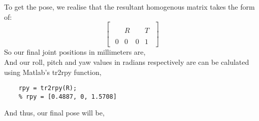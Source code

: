 \documentclass[12pt]{article}
\begin{document}
To get the pose, we realise that the resultant homogenous matrix takes the form of:
\begin{equation*}
    \begin{bmatrix}
        {\begin{array}{ccc|c}&&&\\&R&&T\\&&&\\\hline 0&0&0&1\end{array}}
    \end{bmatrix}
\end{equation*}
So our final joint positions in millimeters are,
\begin{equation*}
    [421.3330, -133.3000, -298.6978]
\end{equation*}
And our roll, pitch and yaw values in radians respectively are can be calulated using Matlab's tr2rpy function,
\begin{center}
    \begin{lstlisting}
    rpy = tr2rpy(R);
    % rpy = [0.4887, 0, 1.5708]
    \end{lstlisting}
\end{center}
And thus, our final pose will be,
\begin{equation*}
    [421.3330, -133.3000, -298.6978, 0.4887, 0, 1.5708]
\end{equation*}
\end{document}
